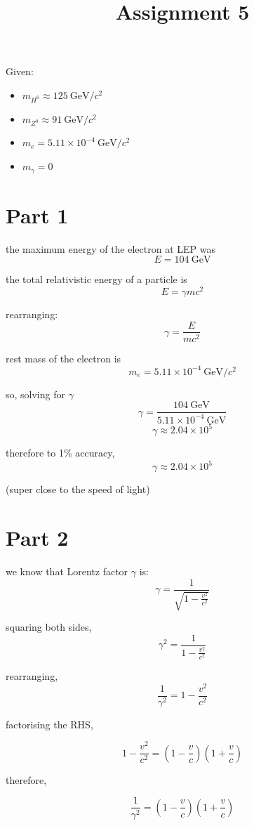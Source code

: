 \documentclass{article}
\title{Assignment 5}
\begin{document}
\setlength{\parindent}{0pt}
\maketitle

Given:

\begin{itemize}
    \item $m_{H^0}\approx 125~\mathrm{GeV}/c^2$
    \item $m_{Z^0}\approx 91~\mathrm{GeV}/c^2$
    \item $m_e=5.11\times10^{-4}~\mathrm{GeV}/c^2$
    \item $m_\gamma=0$
\end{itemize}

\section{Part 1}

the maximum energy of the electron at LEP was
\[
E = 104~\mathrm{GeV}
\]

the total relativistic energy of a particle is 
\[
E = \gamma mc^2
\]

rearranging:
\[
\gamma = \frac{E}{mc^2}
\]

rest mass of the electron is
\[
m_e = 5.11\times10^{-4}~\mathrm{GeV}/c^2
\]

so, solving for $\gamma$
\[
\gamma = \frac{104~\mathrm{GeV}}{5.11\times10^{-4}~\mathrm{GeV}}
\]
\[
\gamma \approx 2.04\times10^5
\]

therefore to 1\% accuracy,
\[
\boxed{\gamma \approx 2.04\times10^5}
\]

(super close to the speed of light)

\section{Part 2}

we know that Lorentz factor $\gamma$ is:
\[
\gamma = \frac{1}{\sqrt{1-\frac{v^2}{c^2}}}
\]

squaring both sides,
\[
\gamma^2 = \frac{1}{1-\frac{v^2}{c^2}}
\]

rearranging,
\[
\frac{1}{\gamma^2}=1-\frac{v^2}{c^2}
\]

factorising the RHS,

\[
1-\frac{v^2}{c^2} = \left(1-\frac{v}{c}\right) \left(1+\frac{v}{c}\right)
\]

therefore,

\[
\frac{1}{\gamma^2} = \left(1-\frac{v}{c}\right) \left(1+\frac{v}{c}\right)
\]
\end{document}
